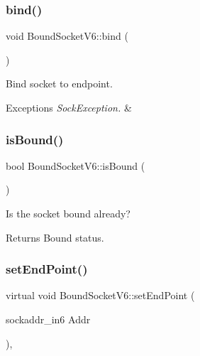 \subsubsection{\texorpdfstring{bind()}{bind()}}
{\footnotesize\ttfamily void Bound\+Socket\+V6\+::bind (\begin{DoxyParamCaption}{ }\end{DoxyParamCaption})\hspace{0.3cm}{\ttfamily [virtual]}}

Bind socket to endpoint. 
\begin{DoxyExceptions}{Exceptions}
{\em Sock\+Exception.} & \\
\hline
\end{DoxyExceptions}
\mbox{\label{classBoundSocketV6_a2a29edc5ad339f83b06bdbc413d949b2}} 
\subsubsection{\texorpdfstring{is\+Bound()}{isBound()}}
{\footnotesize\ttfamily bool Bound\+Socket\+V6\+::is\+Bound (\begin{DoxyParamCaption}{ }\end{DoxyParamCaption})\hspace{0.3cm}{\ttfamily [inline]}}

Is the socket bound already? \begin{DoxyReturn}{Returns}
Bound status. 
\end{DoxyReturn}
\mbox{\label{classBoundSocketV6_a9f16093436c0325253bbb4069bffce0d}} 
\subsubsection{\texorpdfstring{set\+End\+Point()}{setEndPoint()}\hspace{0.1cm}{\footnotesize\ttfamily [1/3]}}
{\footnotesize\ttfamily virtual void Bound\+Socket\+V6\+::set\+End\+Point (\begin{DoxyParamCaption}\item[{sockaddr\+\_\+in6}]{Addr }\end{DoxyParamCaption})\hspace{0.3cm}{\ttfamily [inline]}, {\ttfamily [virtual]}}

